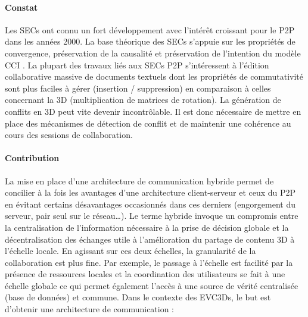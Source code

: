 \paragraph{Constat} Les \glspl{SEC} ont connu un fort développement avec 
l'intérêt 
croissant 
pour le \gls{P2P} dans les années 2000. 
La base théorique des \glspl{SEC} s'appuie sur les propriétés de 
convergence, préservation de la causalité et préservation de l'intention du modèle 
\acrshort{CCI} \cite{Sun1998}. 
La plupart des travaux liés aux \glspl{SEC} \gls{P2P} s'intéressent à 
l'édition collaborative massive de documents textuels dont les propriétés 
de commutativité sont plus faciles à gérer (insertion / suppression) en 
comparaison à celles concernant la \gls{3D} (multiplication de matrices de 
rotation). La génération de conflits en \gls{3D} peut vite devenir incontrôlable. Il est 
donc nécessaire de mettre en place des mécanismes de détection de 
conflit et de maintenir une cohérence au cours des sessions de 
collaboration. 








\paragraph{Contribution}
La mise en place d'une architecture de communication 
hybride permet de concilier à la 
fois les avantages d'une architecture client-serveur et ceux du \gls{P2P} en évitant 
certains désavantages occasionnés dans ces derniers (engorgement du serveur, 
pair seul sur le réseau\dots). 
Le terme \og hybride\fg{} invoque un compromis entre la 
centralisation de l'information nécessaire à la prise de décision globale et 
la décentralisation des échanges utile à l'amélioration du partage de 
contenu \gls{3D} à l'échelle locale. 
En agissant sur ces deux échelles, la granularité de la collaboration est plus fine. 
Par exemple, le passage à l'échelle est facilité par la présence de 
ressources locales et la coordination des utilisateurs se fait à une échelle 
globale ce qui permet également l'accès à une source de vérité 
centralisée (base de données) et commune.
Dans le contexte des \glspl{EVC3D}, le but 
est d'obtenir une architecture de communication : 

